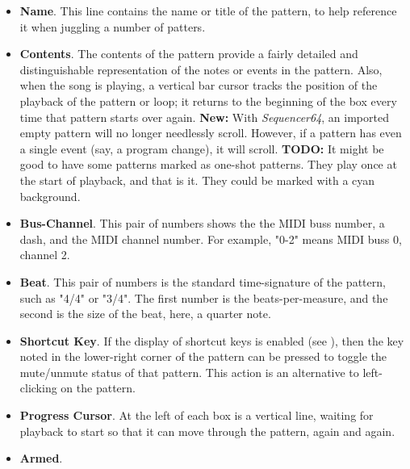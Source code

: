    \begin{itemize}
      \item \textbf{Name}.
         This line contains the name or title of the pattern, to help
         reference it when juggling a number of patters.
      \item \textbf{Contents}.
         The contents of the pattern provide a fairly detailed and
         distinguishable representation of the notes or events in the
         pattern.  Also, when the song is playing, a vertical bar cursor
         tracks the position of the playback of the pattern or loop; it
         returns to the beginning of the box every time that pattern starts
         over again.
         \textbf{New:}
         With \textsl{Sequencer64}, an imported empty pattern will no longer
         needlessly scroll.
         However, if a pattern has even a single event (say, a program change),
         it will scroll.
         \textbf{TODO:}
         It might be good to have some patterns marked as one-shot patterns.
         They play once at the start of playback, and that is it.
         They could be marked with a cyan background.
      \item \textbf{Bus-Channel}.
         This pair of numbers shows the the MIDI buss number, a dash, and
         the MIDI channel number.
         For example, "0-2" means MIDI buss 0, channel 2.
      \item \textbf{Beat}.
         This pair of numbers is the standard time-signature of the pattern,
         such as "4/4" or "3/4".  The first number is the beats-per-measure,
         and the second is the size of the beat, here, a quarter note.
      \item \textbf{Shortcut Key}.
         If the display of shortcut keys is enabled (see
         ),
         then the key noted in the lower-right corner of the pattern can be
         pressed to toggle the mute/unmute status of that pattern.
         This action is an alternative to left-clicking on the pattern.
      \item \textbf{Progress Cursor}.
         At the left of each box is a vertical line, waiting for playback to
         start so that it can move through the pattern, again and again.
      \item \textbf{Armed}.

\end{itemize}
